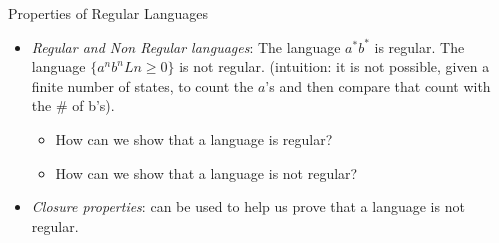 \documentclass{prosper}%
\newcommand{\e} {{\mbox{$\epsilon$}}}
\begin{document}
\begin{comment}
\begin{slide}{Examples}
\begin{itemize}
\item To prove $(L + M)^* = (L^*M^*)^*$ it is enough to determine if $(a+b)^*$ is equivalent to $(a^*b^*)^*$
\begin{description}
\item[Answer:] Both REs denote language with all strings of $a$'s and $b$'s. Thus the two concrete expressions denote the same language, and the law holds.
\end{description}
\item To verify $L^* = L^*L^*$ test if $a^*$ is equivalent to $a^*a^*$.
\begin{description}
\item[Answer:] Both REs denote the  language with all strings of $a$'s. Thus the two concrete expressions denote the same language, and the law holds.
\end{description}
\item Question: Does $L + ML = (L + M)L$ hold? And $L + ML = (\e + M)L$?
\end{itemize}
\end{slide}
\end{comment}

\begin{slide}{Properties of Regular Languages}
\begin{itemize}
\item {\em Regular and Non Regular languages}:  The language $a^*b^*$ is regular. The language $\{a^nb^nL n\geq0\}$ is not regular. (intuition: it is not possible, given a finite number of states, to count the $a$'s and then compare that count with the \# of b's).
\begin{itemize}
\item How can we show that a language is regular?
\item How can we show that a language is not regular?
\end{itemize} 
\item {\em Closure properties}:  can be used to help us prove that a language is not regular.
\end{itemize}
\end{slide}
\end{document}
